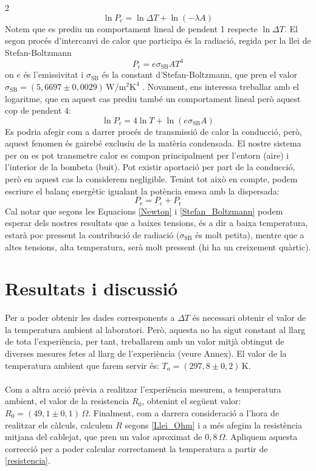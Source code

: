 \documentclass[12pt,twosides,onecolumn,openany]{article}
\begin{document}
\begin{multicols}{2}
\begin{equation}
  \ln{P_{\text{c}}} = \ln{\Delta T} + \ln{(-\lambda A)}
\end{equation}
Notem que es prediu un comportament lineal de pendent 1 respecte $\ln{\Delta T}$. El segon procés d'intercanvi de calor que participa és la radiació, regida per la llei de Stefan-Boltzmann
\begin{equation}\label{Stefan_Boltzmann}
  P_{\text{r}} = e\sigma_{\text{SB}}AT^{4}
\end{equation}
on $e$ és l'emissivitat i $\sigma_{\text{SB}}$ és la constant d'Stefan-Boltzmann, que pren el valor \(\sigma_{\text{SB}} = (5,6697\pm0,0029) \, \text{W}/\text{m}^{2}\text{K}^{4}\) \cite{guia_lab}. Novament, ens interessa treballar amb el logaritme, que en aquest cas prediu també un comportament lineal però aquest cop de pendent 4:
\begin{equation}\label{ln_Stefan_Boltzmann}
  \ln{P_{\text{r}}} = 4\ln{T} + \ln{(e\sigma_{\text{SB}}A)}
\end{equation}
Es podria afegir com a darrer procés de transmissió de calor la conducció, però, aquest fenomen és gairebé exclusiu de la matèria condensada. El nostre sistema per on es pot transmetre calor es compon principalment per l'entorn (aire) i l'interior de la bombeta (buit). Pot existir aportació per part de la conducció, però en aquest cas la considerem negligible. Tenint tot això en compte, podem escriure el balanç energètic igualant la potència emesa amb la dispersada:
\begin{equation}\label{relacions_pot}
  P_{\text{e}}=P_{\text{c}} + P_{\text{r}}
\end{equation}
Cal notar que segons les Equacions \eqref{Newton} i \eqref{Stefan_Boltzmann} podem esperar dels nostres resultats que a baixes tensions, és a dir a baixa temperatura, estarà poc pressent la contribució de radiació ($\sigma_{\text{SB}}$ és molt petita), mentre que a altes tensions, alta temperatura, serà molt pressent (hi ha un creixement quàrtic).
\section{Resultats i discussió}
Per a poder obtenir les dades corresponents a $\Delta T$ és necessari obtenir el valor de la temperatura ambient al laboratori. Però, aquesta no ha sigut constant al llarg de tota l'experiència, per tant, treballarem amb un valor mitjà obtingut de diverses mesures fetes al llarg de l'experiència (veure Annex). El valor de la temperatura ambient que farem servir és: \(T_a = (297,8\pm0,2)\,\text{K} \).\\\\
Com a altra acció prèvia a realitzar l'experiència mesurem, a temperatura ambient, el valor de la resistencia $R_0$, obtenint el següent valor: \(R_0=(49,1\pm0,1)\,\Omega\). Finalment, com a darrera consideració a l'hora de realitzar els càlculs, calculem $R$ segons \eqref{Llei_Ohm} i a més afegim la resistència mitjana del cablejat, que pren un valor aproximat de \(0,8 \, \Omega\). Apliquem aquesta correcció per a poder calcular correctament la temperatura a partir de \eqref{resistencia}.

\end{multicols}
\end{document}

